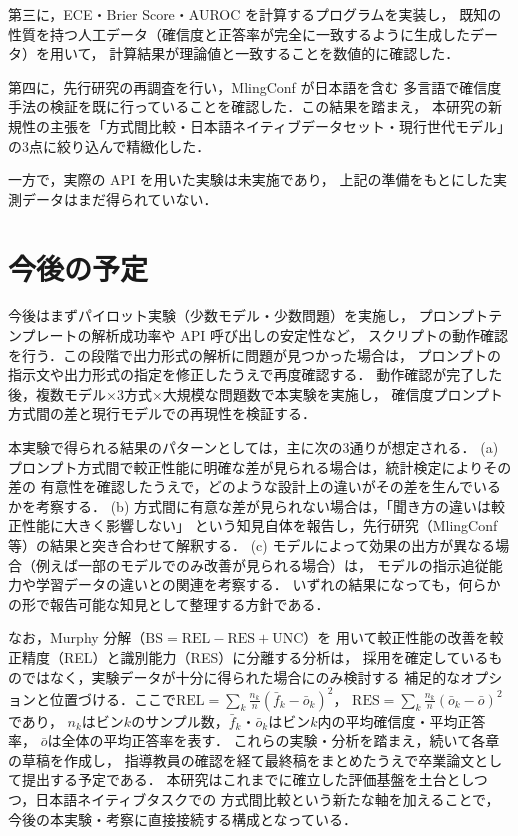 \documentclass[10pt,a4paper,twocolumn]{article}
\begin{document}
第三に，ECE・Brier Score・AUROC を計算するプログラムを実装し，
既知の性質を持つ人工データ（確信度と正答率が完全に一致するように生成したデータ）を用いて，
計算結果が理論値と一致することを数値的に確認した．

第四に，先行研究の再調査を行い，MlingConf\cite{xue2025mlingconf} が日本語を含む
多言語で確信度手法の検証を既に行っていることを確認した．この結果を踏まえ，
本研究の新規性の主張を「方式間比較・日本語ネイティブデータセット・現行世代モデル」
の3点に絞り込んで精緻化した．

一方で，実際の API を用いた実験は未実施であり，
上記の準備をもとにした実測データはまだ得られていない．

\section{今後の予定}

今後はまずパイロット実験（少数モデル・少数問題）を実施し，
プロンプトテンプレートの解析成功率や API 呼び出しの安定性など，
スクリプトの動作確認を行う．この段階で出力形式の解析に問題が見つかった場合は，
プロンプトの指示文や出力形式の指定を修正したうえで再度確認する．
動作確認が完了した後，複数モデル×3方式×大規模な問題数で本実験を実施し，
確信度プロンプト方式間の差と現行モデルでの再現性を検証する．

本実験で得られる結果のパターンとしては，主に次の3通りが想定される．
(a) プロンプト方式間で較正性能に明確な差が見られる場合は，統計検定によりその差の
有意性を確認したうえで，どのような設計上の違いがその差を生んでいるかを考察する．
(b) 方式間に有意な差が見られない場合は，「聞き方の違いは較正性能に大きく影響しない」
という知見自体を報告し，先行研究（MlingConf 等）の結果と突き合わせて解釈する．
(c) モデルによって効果の出方が異なる場合（例えば一部のモデルでのみ改善が見られる場合）は，
モデルの指示追従能力や学習データの違いとの関連を考察する．
いずれの結果になっても，何らかの形で報告可能な知見として整理する方針である．

なお，Murphy 分解\cite{murphy1973vector}（$\text{BS} = \text{REL} - \text{RES} + \text{UNC}$）を
用いて較正性能の改善を較正精度（REL）と識別能力（RES）に分離する分析は，
採用を確定しているものではなく，実験データが十分に得られた場合にのみ検討する
補足的なオプションと位置づける．ここで$\text{REL} = \sum_k \frac{n_k}{n}(\bar{f}_k - \bar{o}_k)^2$，
$\text{RES} = \sum_k \frac{n_k}{n}(\bar{o}_k - \bar{o})^2$であり，
$n_k$はビン$k$のサンプル数，$\bar{f}_k$・$\bar{o}_k$はビン$k$内の平均確信度・平均正答率，
$\bar{o}$は全体の平均正答率を表す．
これらの実験・分析を踏まえ，続いて各章の草稿を作成し，
指導教員の確認を経て最終稿をまとめたうえで卒業論文として提出する予定である．
本研究はこれまでに確立した評価基盤を土台としつつ，日本語ネイティブタスクでの
方式間比較という新たな軸を加えることで，今後の本実験・考察に直接接続する構成となっている．
\end{document}
